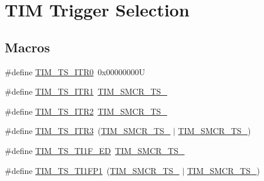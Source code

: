 \hypertarget{group___t_i_m___trigger___selection}{}\section{T\+IM Trigger Selection}
\label{group___t_i_m___trigger___selection}
\subsection*{Macros}
\begin{DoxyCompactItemize}
\item 
\#define \hyperlink{group___t_i_m___trigger___selection_gab7cf2b7db3956d4fd1e5a5d84f4891e7}{T\+I\+M\+\_\+\+T\+S\+\_\+\+I\+T\+R0}~0x00000000U
\item 
\#define \hyperlink{group___t_i_m___trigger___selection_gad90fbca297153ca9c0112a67ea2c6cb3}{T\+I\+M\+\_\+\+T\+S\+\_\+\+I\+T\+R1}~\hyperlink{group___peripheral___registers___bits___definition_ga8d1f040f9259acb3c2fba7b0c7eb3d96}{T\+I\+M\+\_\+\+S\+M\+C\+R\+\_\+\+T\+S\+\_}
\item 
\#define \hyperlink{group___t_i_m___trigger___selection_ga8599ba58a5f911d648503c7ac55d4320}{T\+I\+M\+\_\+\+T\+S\+\_\+\+I\+T\+R2}~\hyperlink{group___peripheral___registers___bits___definition_gacb82212fcc89166a43ff97542da9182d}{T\+I\+M\+\_\+\+S\+M\+C\+R\+\_\+\+T\+S\+\_}
\item 
\#define \hyperlink{group___t_i_m___trigger___selection_ga63183e611b91c5847040172c0069514d}{T\+I\+M\+\_\+\+T\+S\+\_\+\+I\+T\+R3}~(\hyperlink{group___peripheral___registers___bits___definition_ga8d1f040f9259acb3c2fba7b0c7eb3d96}{T\+I\+M\+\_\+\+S\+M\+C\+R\+\_\+\+T\+S\+\_} $\vert$ \hyperlink{group___peripheral___registers___bits___definition_gacb82212fcc89166a43ff97542da9182d}{T\+I\+M\+\_\+\+S\+M\+C\+R\+\_\+\+T\+S\+\_})
\item 
\#define \hyperlink{group___t_i_m___trigger___selection_ga8c89554efc693e679c94b5a749af123c}{T\+I\+M\+\_\+\+T\+S\+\_\+\+T\+I1\+F\+\_\+\+ED}~\hyperlink{group___peripheral___registers___bits___definition_gacf0dbaf4a2ec8759f283f82a958ef6a8}{T\+I\+M\+\_\+\+S\+M\+C\+R\+\_\+\+T\+S\+\_}
\item 
\#define \hyperlink{group___t_i_m___trigger___selection_ga38d3514d54bcdb0ea8ac8bd91c5832b5}{T\+I\+M\+\_\+\+T\+S\+\_\+\+T\+I1\+F\+P1}~(\hyperlink{group___peripheral___registers___bits___definition_ga8d1f040f9259acb3c2fba7b0c7eb3d96}{T\+I\+M\+\_\+\+S\+M\+C\+R\+\_\+\+T\+S\+\_} $\vert$ \hyperlink{group___peripheral___registers___bits___definition_gacf0dbaf4a2ec8759f283f82a958ef6a8}{T\+I\+M\+\_\+\+S\+M\+C\+R\+\_\+\+T\+S\+\_})

\end{DoxyCompactItemize}
